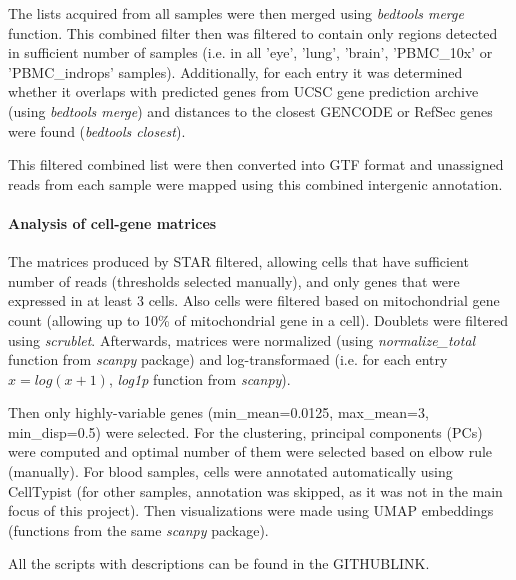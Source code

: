 The lists acquired from all samples were then merged using \textit{bedtools merge} function.
This combined filter then was filtered to contain only regions detected in sufficient number of samples
(i.e. in all 'eye', 'lung', 'brain', 'PBMC\_10x' or 'PBMC\_indrops' samples).
Additionally, for each entry it was determined whether it overlaps with predicted genes from UCSC gene prediction archive
(using \textit{bedtools merge}) and distances to the closest GENCODE or RefSec genes were found (\textit{bedtools closest}).

This filtered combined list were then converted into GTF format and unassigned reads from each sample were mapped using this
combined intergenic annotation.

\paragraph{Analysis of cell-gene matrices}

The matrices produced by STAR filtered, allowing cells that have sufficient number of reads (thresholds selected manually),
and only genes that were expressed in at least 3 cells.
Also cells were filtered based on mitochondrial gene count (allowing up to 10\% of mitochondrial gene in a cell).
Doublets were filtered using \textit{scrublet}.
Afterwards, matrices were normalized (using \textit{normalize\_total} function from \textit{scanpy} package) and log-transformaed
(i.e. for each entry $x = log(x+1)$, \textit{log1p} function from \textit{scanpy}).

Then only highly-variable genes (min\_mean=0.0125, max\_mean=3, min\_disp=0.5) were selected.
For the clustering, principal components (PCs) were computed and optimal number of them were selected based on elbow rule (manually).
For blood samples, cells were annotated automatically using CellTypist
(for other samples, annotation was skipped, as it was not in the main focus of this project).
Then visualizations were made using UMAP embeddings (functions from the same \textit{scanpy} package).

All the scripts with descriptions can be found in the GITHUBLINK.
